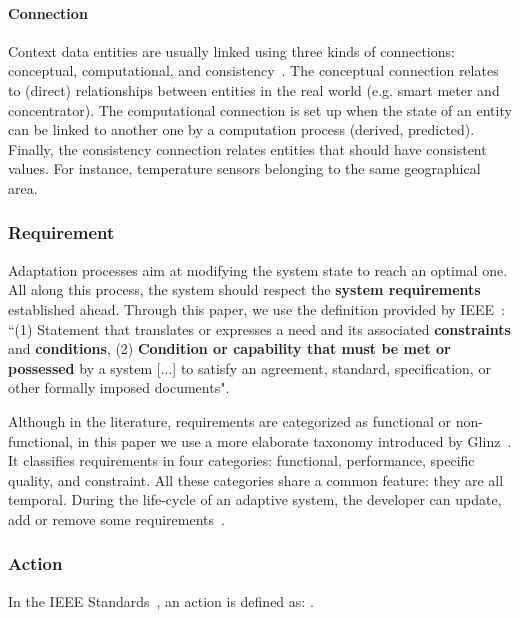\paragraph{Connection}
Context data entities are usually linked using three kinds of connections: conceptual, computational, and consistency~\cite{DBLP:conf/pervasive/HenricksenIR02, bettini2010survey}.
The conceptual connection relates to  (direct) relationships between entities in the real world (e.g. smart meter and concentrator).
The computational connection is set up when the state of an entity can be linked to another one by a computation process (derived, predicted). 
Finally, the consistency connection relates entities that should have consistent values. For instance, temperature sensors belonging to the same geographical area.

\subsubsection{Requirement}
\label{sec:adaptation-req}

Adaptation processes aim at modifying the system state to reach an optimal one.
All along this process, the system should respect the \textbf{system requirements} established ahead. 
Through this paper, we use the definition provided by IEEE~\cite{iso2017systems}: ``(1) Statement that translates or expresses a need and its associated \textbf{constraints} and \textbf{conditions}, (2) \textbf{Condition or capability that must be met or possessed} by a system [...] to satisfy an agreement, standard, specification, or other formally imposed documents".

Although in the literature, requirements are categorized as functional or non-functional, in this paper we use a more elaborate taxonomy introduced by Glinz~\cite{DBLP:conf/re/Glinz07}.
It classifies requirements in four categories: functional, performance, specific quality, and constraint.
All these categories share a common feature: they are all temporal.
During the life-cycle of an adaptive system, the developer can update, add or remove some requirements~\cite{DBLP:conf/icse/ChengA07, pandey2010effective}.

\subsubsection{Action}
In the IEEE Standards~\cite{iso2017systems}, an action is defined as: .

